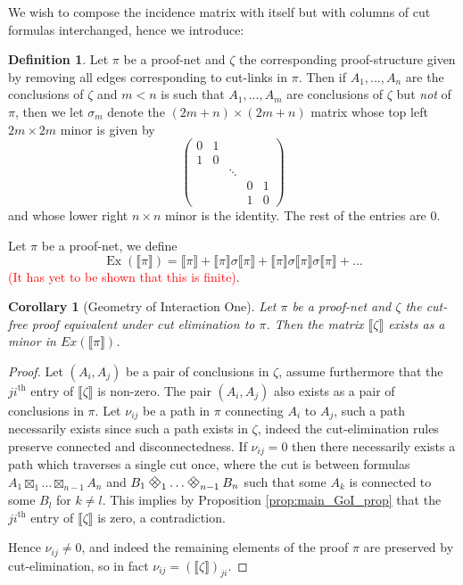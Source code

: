 \documentclass[12pt]{article}
\theoremstyle{plain}
\newtheorem{cor}[thm]{Corollary}
\theoremstyle{definition}
\newtheorem{defn}[thm]{Definition} %
\DeclareRobustCommand{\diamondtimes}{%
  \mathbin{\text{\rotatebox[origin=c]{45}{$\boxplus$}}}%
}
\begin{document}
We wish to compose the incidence matrix with itself but with columns of cut formulas interchanged, hence we introduce:
\begin{defn}
Let $\pi$ be a proof-net and $\zeta$ the corresponding proof-structure given by removing all edges corresponding to cut-links in $\pi$. Then if $A_1,...,A_n$ are the conclusions of $\zeta$ and $m < n$ is such that $A_1,...,A_m$ are conclusions of $\zeta$ but \emph{not} of $\pi$, then we let $\sigma_m$ denote the $(2m + n) \times (2m + n)$ matrix whose top left $2m \times 2m$ minor is given by
\begin{equation}
\begin{pmatrix}
0 & 1\\
1 & 0\\
& & \ddots\\
& & & 0 & 1\\
& & & 1 & 0
\end{pmatrix}
\end{equation}
and whose lower right $n \times n$ minor is the identity. The rest of the entries are 0.

Let $\pi$ be a proof-net, we define
\begin{equation}
\operatorname{Ex}(\llbracket \pi \rrbracket) = \llbracket \pi \rrbracket + \llbracket \pi \rrbracket \sigma \llbracket \pi \rrbracket + \llbracket \pi \rrbracket \sigma \llbracket \pi \rrbracket \sigma \llbracket \pi \rrbracket + \hdots
\end{equation}
\textcolor{red}{(It has yet to be shown that this is finite)}.
\end{defn}
\begin{cor}[Geometry of Interaction One]\label{cor:GoI_one}
Let $\pi$ be a proof-net and $\zeta$ the cut-free proof equivalent under cut elimination to $\pi$. Then the matrix $\llbracket \zeta\rrbracket$ exists as a minor in $Ex(\llbracket \pi \rrbracket)$.
\end{cor}
\begin{proof}
Let $(A_i,A_j)$ be a pair of conclusions in $\zeta$, assume furthermore that the $ji^{\text{th}}$ entry of $\llbracket \zeta \rrbracket$ is non-zero. The pair $(A_i,A_j)$ also exists as a pair of conclusions in $\pi$. Let $\nu_{ij}$ be a path in $\pi$ connecting $A_i$ to $A_j$, such a path necessarily exists since such a path exists in $\zeta$, indeed the cut-elimination rules preserve connected and disconnectedness. If $\nu_{ij} = 0$ then there necessarily exists a path which traverses a single cut once, where the cut is between formulas $A_1 \boxtimes_1 \hdots \boxtimes_{n-1} A_n$ and $B_1 \diamondtimes_1 \hdots \diamondtimes_{n-1} B_n$ such that some $A_k$ is connected to some $B_l$ for $k \neq l$. This implies by Proposition \ref{prop:main_GoI_prop} that the $ji^{\text{th}}$ entry of $\llbracket \zeta \rrbracket$ is zero, a contradiction.

Hence $\nu_{ij} \neq 0$, and indeed the remaining elements of the proof $\pi$ are preserved by cut-elimination, so in fact $\nu_{ij} = (\llbracket \zeta \rrbracket)_{ji}$.
\end{proof}
\end{document}
